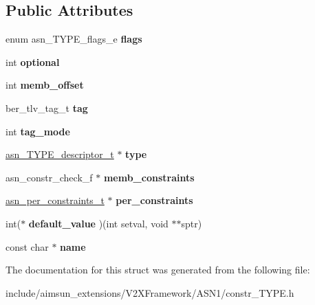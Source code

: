 \subsection*{Public Attributes}
\begin{DoxyCompactItemize}
\item 
enum asn\+\_\+\+T\+Y\+P\+E\+\_\+flags\+\_\+e {\bfseries flags}\hypertarget{structasn__TYPE__member__s_ad68a2e56242af0712af99fa75cff3406}{}\label{structasn__TYPE__member__s_ad68a2e56242af0712af99fa75cff3406}

\item 
int {\bfseries optional}\hypertarget{structasn__TYPE__member__s_aefa11aa34e9e47b0ebcdcbe5b66dc96f}{}\label{structasn__TYPE__member__s_aefa11aa34e9e47b0ebcdcbe5b66dc96f}

\item 
int {\bfseries memb\+\_\+offset}\hypertarget{structasn__TYPE__member__s_a80a62dea12ff1b6e587fd0af97c4823c}{}\label{structasn__TYPE__member__s_a80a62dea12ff1b6e587fd0af97c4823c}

\item 
ber\+\_\+tlv\+\_\+tag\+\_\+t {\bfseries tag}\hypertarget{structasn__TYPE__member__s_a7b1bd68f8a254c0e87c31985d71d500e}{}\label{structasn__TYPE__member__s_a7b1bd68f8a254c0e87c31985d71d500e}

\item 
int {\bfseries tag\+\_\+mode}\hypertarget{structasn__TYPE__member__s_a0e066b601beba109db9ed2c98b4ec63c}{}\label{structasn__TYPE__member__s_a0e066b601beba109db9ed2c98b4ec63c}

\item 
\hyperlink{structasn__TYPE__descriptor__s}{asn\+\_\+\+T\+Y\+P\+E\+\_\+descriptor\+\_\+t} $\ast$ {\bfseries type}\hypertarget{structasn__TYPE__member__s_a03213b5d84dc8a92c49685f24aaf83ea}{}\label{structasn__TYPE__member__s_a03213b5d84dc8a92c49685f24aaf83ea}

\item 
asn\+\_\+constr\+\_\+check\+\_\+f $\ast$ {\bfseries memb\+\_\+constraints}\hypertarget{structasn__TYPE__member__s_af9e152adaff281b054caf70ba1865e82}{}\label{structasn__TYPE__member__s_af9e152adaff281b054caf70ba1865e82}

\item 
\hyperlink{structasn__per__constraints__s}{asn\+\_\+per\+\_\+constraints\+\_\+t} $\ast$ {\bfseries per\+\_\+constraints}\hypertarget{structasn__TYPE__member__s_ad92283728040413ca70956874344436a}{}\label{structasn__TYPE__member__s_ad92283728040413ca70956874344436a}

\item 
int($\ast$ {\bfseries default\+\_\+value} )(int setval, void $\ast$$\ast$sptr)\hypertarget{structasn__TYPE__member__s_ab68957350003d9a2f11e548a3ef1088f}{}\label{structasn__TYPE__member__s_ab68957350003d9a2f11e548a3ef1088f}

\item 
const char $\ast$ {\bfseries name}\hypertarget{structasn__TYPE__member__s_a9b03b2a79aa01871dae00c6579e2be17}{}\label{structasn__TYPE__member__s_a9b03b2a79aa01871dae00c6579e2be17}

\end{DoxyCompactItemize}


The documentation for this struct was generated from the following file\+:\begin{DoxyCompactItemize}
\item 
include/aimsun\+\_\+extensions/\+V2\+X\+Framework/\+A\+S\+N1/constr\+\_\+\+T\+Y\+P\+E.\+h\end{DoxyCompactItemize}
